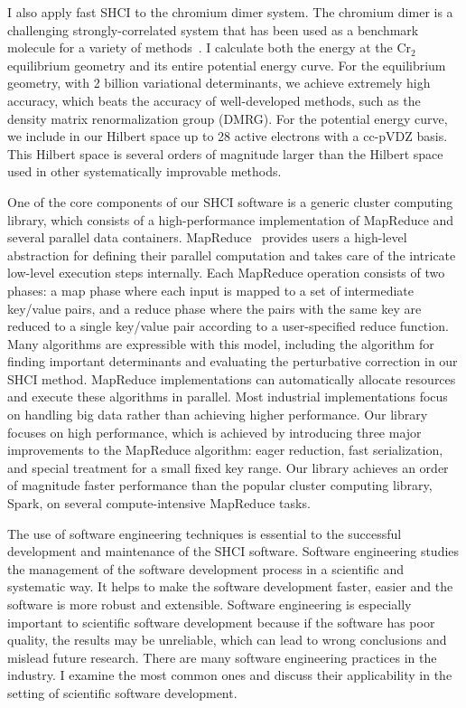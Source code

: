 \documentclass[phd,tocprelim]{cornell}
\begin{document}
I also apply fast SHCI to the chromium dimer system.
The chromium dimer is a challenging strongly-correlated system that has been used as a benchmark molecule for a variety of methods~\cite{Scu-JCP-91,KurYan-JCP-11,PurZhaKra-JCP-15,MaManOlsGag-JCTC-16,VanMalVer-JCTC-16,GuoWatHuSunCha-JCTC-16}.
I calculate both the energy at the Cr$_2$ equilibrium geometry and its entire potential energy curve.
For the equilibrium geometry, with 2 billion variational determinants, we achieve extremely high accuracy, which beats the accuracy of well-developed methods, such as the density matrix renormalization group (DMRG).
For the potential energy curve, we include in our Hilbert space up to 28 active electrons with a cc-pVDZ basis.
This Hilbert space is several orders of magnitude larger than the Hilbert space used in other systematically improvable methods.

One of the core components of our SHCI software is a generic cluster computing library, which consists of a high-performance implementation of MapReduce and several parallel data containers.
MapReduce~\cite{dean2008mapreduce,dean2010mapreduce} provides users a high-level abstraction for defining their parallel computation and takes care of the intricate low-level execution steps internally.
Each MapReduce operation consists of two phases: a map phase where each input is mapped to a set of intermediate key/value pairs, and a reduce phase where the pairs with the same key are reduced to a single key/value pair according to a user-specified reduce function.
Many algorithms are expressible with this model, including the algorithm for finding important determinants and evaluating the perturbative correction in our SHCI method.
MapReduce implementations can automatically allocate resources and execute these algorithms in parallel.
Most industrial implementations focus on handling big data rather than achieving higher performance.
Our library focuses on high performance, which is achieved by introducing three major improvements to the MapReduce algorithm: eager reduction, fast serialization, and special treatment for a small fixed key range.
Our library achieves an order of magnitude faster performance than the popular cluster computing library, Spark, on several compute-intensive MapReduce tasks.

The use of software engineering techniques is essential to the successful development and maintenance of the SHCI software.
Software engineering studies the management of the software development process in a scientific and systematic way.
It helps to make the software development faster, easier and the software is more robust and extensible.
Software engineering is especially important to scientific software development because if the software has poor quality, the results may be unreliable, which can lead to wrong conclusions and mislead future research.
There are many software engineering practices in the industry.
I examine the most common ones and discuss their applicability in the setting of scientific software development.
\end{document}
